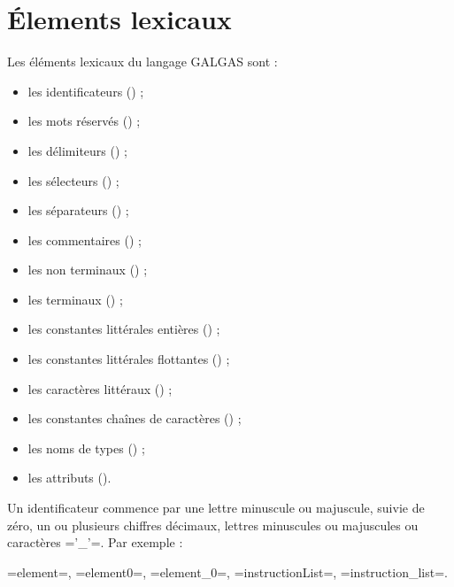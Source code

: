 
\chapter{Élements lexicaux}

Les éléments lexicaux du langage GALGAS sont :
\begin{itemize}
  \item les identificateurs () ;
  \item les mots réservés () ;
  \item les délimiteurs () ;
  \item les sélecteurs  () ;
  \item les séparateurs  () ;
  \item les commentaires  () ;
  \item les non terminaux  () ;
  \item les terminaux () ;
  \item les constantes littérales entières () ;
  \item les constantes littérales flottantes () ;
  \item les caractères littéraux () ;
  \item les constantes chaînes de caractères () ;
  \item les noms de types () ;
  \item les attributs ().
\end{itemize}



Un identificateur commence par une lettre minuscule ou majuscule, suivie de zéro, un ou plusieurs chiffres décimaux, lettres minuscules ou majuscules ou caractères \ggs='_'=. Par exemple :

\ggs=element=, \ggs=element0=, \ggs=element_0=, \ggs=instructionList=, \ggs=instruction_list=.

